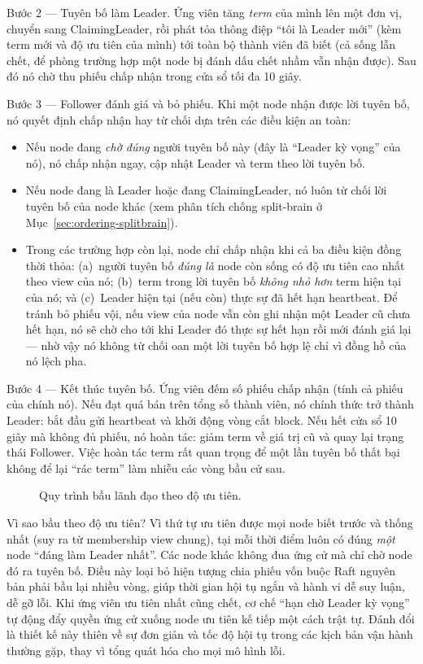 Bước 2 --- Tuyên bố làm Leader. Ứng viên tăng \textit{term} của mình lên
một đơn vị, chuyển sang ClaimingLeader, rồi phát tỏa thông điệp ``tôi là Leader
mới'' (kèm term mới và độ ưu tiên của mình) tới toàn bộ thành viên đã biết
(cả sống lẫn chết, để phòng trường hợp một node bị đánh dấu chết nhầm vẫn nhận
được). Sau đó nó chờ thu phiếu chấp nhận trong cửa sổ tối đa 10 giây.

Bước 3 --- Follower đánh giá và bỏ phiếu. Khi một node nhận được lời
tuyên bố, nó quyết định chấp nhận hay từ chối dựa trên các điều kiện an toàn:

\begin{itemize}
  \item Nếu node đang \textit{chờ đúng} người tuyên bố này (đây là ``Leader kỳ
  vọng'' của nó), nó chấp nhận ngay, cập nhật Leader và term theo lời tuyên bố.
  \item Nếu node đang là Leader hoặc đang ClaimingLeader, nó luôn từ chối
  lời tuyên bố của node khác (xem phân tích chống split-brain ở
  Mục~\ref{sec:ordering-splitbrain}).
  \item Trong các trường hợp còn lại, node chỉ chấp nhận khi cả ba điều kiện đồng
  thời thỏa: (a)~người tuyên bố \textit{đúng là} node còn sống có độ ưu tiên cao
  nhất theo view của nó; (b)~term trong lời tuyên bố \textit{không nhỏ hơn} term
  hiện tại của nó; và (c)~Leader hiện tại (nếu còn) thực sự đã hết hạn heartbeat.
  Để tránh bỏ phiếu vội, nếu view của node vẫn còn ghi nhận một Leader cũ chưa hết
  hạn, nó sẽ chờ cho tới khi Leader đó thực sự hết hạn rồi mới đánh giá lại --- nhờ
  vậy nó không từ chối oan một lời tuyên bố hợp lệ chỉ vì đồng hồ của nó lệch pha.
\end{itemize}

Bước 4 --- Kết thúc tuyên bố. Ứng viên đếm số phiếu chấp nhận (tính cả
phiếu của chính nó). Nếu đạt quá bán trên tổng số thành viên, nó chính
thức trở thành Leader: bắt đầu gửi heartbeat và khởi động vòng cắt block. Nếu hết
cửa sổ 10 giây mà không đủ phiếu, nó hoàn tác: giảm term về giá trị cũ và
quay lại trạng thái Follower. Việc hoàn tác term rất quan trọng để một lần tuyên bố
thất bại không để lại ``rác term'' làm nhiễu các vòng bầu cử sau.

\begin{figure}[H]
\centering
\caption{Quy trình bầu lãnh đạo theo độ ưu tiên.}
\label{fig:election}
\end{figure}

Vì sao bầu theo độ ưu tiên? Vì thứ tự ưu tiên được mọi node biết trước và
thống nhất (suy ra từ membership view chung), tại mỗi thời điểm luôn có đúng
\textit{một} node ``đáng làm Leader nhất''. Các node khác không đua ứng cử mà chỉ
chờ node đó ra tuyên bố. Điều này loại bỏ hiện tượng chia phiếu vốn buộc Raft
nguyên bản phải bầu lại nhiều vòng, giúp thời gian hội tụ ngắn và hành vi dễ suy
luận, dễ gỡ lỗi. Khi ứng viên ưu tiên nhất cũng chết, cơ chế ``hạn chờ Leader kỳ
vọng'' tự động đẩy quyền ứng cử xuống node ưu tiên kế tiếp một cách trật tự. Đánh
đổi là thiết kế này thiên về sự đơn giản và tốc độ hội tụ trong các kịch bản vận
hành thường gặp, thay vì tổng quát hóa cho mọi mô hình lỗi.

